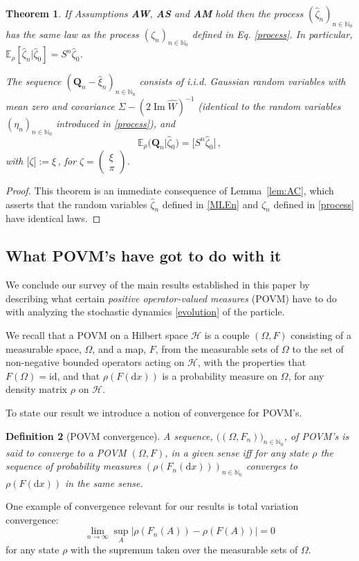 \documentclass[11pt]{article}
\newtheorem{theorem}{Theorem}[section]
\newtheorem{definition}[theorem]{Definition}
\renewcommand{\Im}{\operatorname{Im}}
\renewcommand{\d}{{\mathrm d}}
\newcommand{\id}{\mathrm{id}}
\begin{document}
\begin{theorem}
	\label{thm:AR}
	If Assumptions {\bf{AW}}, {\bf{AS}} and {\bf{AM}} hold
	then the process $(\widehat{\zeta}_n)_{n\in \mathbb N_0}$ has the same law as the process $(\zeta_n)_{n\in\mathbb N_0}$ defined in Eq. \eqref{process}. In particular, $\mathbb{E}_\rho[\widehat{\zeta}_n| \widehat{\zeta}_0] = 
	S^n \widehat{\zeta}_0$.
	
	The sequence $(\mathbf Q_n-\widehat{\xi}_n)_{n\in\mathbb N_0}$ consists of i.i.d. Gaussian random variables with mean zero and covariance $\Sigma-(2\Im\widehat W)^{-1}$ (identical to the random variables 
	$(\eta_n)_{n\in \mathbb{N}_0}$ introduced in \eqref{process}), and
	$$
	\mathbb{E}_\rho \big(\mathbf Q_n  | \widehat{\zeta}_0\big) =  \big[S^n \widehat{\zeta}_0\big]\,,
	$$
	with $\big[\zeta\big] := \xi$\,, for $\zeta=\begin{pmatrix} \xi\\ \pi \end{pmatrix}$.
\end{theorem}
\begin{proof}
	This theorem is an immediate consequence of Lemma~\ref{lem:AC}, which asserts that the random variables 
	$\widehat{\zeta}_n$ defined in \eqref{MLEn} and ${\zeta}_n$ defined in \eqref{process} have identical laws. 	\end{proof}
\subsection{What POVM's have got to do with it}\label{povm}
We conclude our survey of the main results established in this paper by describing what certain \textit{positive operator-valued measures} (POVM) have to do with analyzing the stochastic dynamics \eqref{evolution} of the particle.

We recall that a POVM on a Hilbert space $\mathcal{H}$ is a couple $(\Omega,F)$ consisting 
of a measurable space, $\Omega$, and a map, $F$, from the measurable sets of $\Omega$ to the set of 
non-negative bounded operators acting on $\mathcal{H}$, with the properties that $F(\Omega)=\id$,
and that $\rho(F(\d x))$ is a probability measure on $\Omega$, for any density matrix $\rho$ on 
$\mathcal{H}$.

To state our result we introduce a notion of convergence for POVM's.

\begin{definition}[POVM convergence]
A sequence, $\big((\Omega,F_n)\big)_{n\in \mathbb{N}_0}$, of POVM's is said to converge to a POVM 
$(\Omega,F)$, in a given sense iff for any state $\rho$ the sequence of probability measures $(\rho(F_n(\d x)))_{n\in\mathbb N_0}$ converges to $\rho(F(\d x))$ in the same sense.
\end{definition}
One example of convergence relevant for our results is total variation convergence:
$$\lim_{n\to\infty}\sup_{A}|\rho(F_n(A))-\rho(F(A))|=0$$
for any state $\rho$ with the supremum taken over the measurable sets of $\Omega$.
\end{document}
